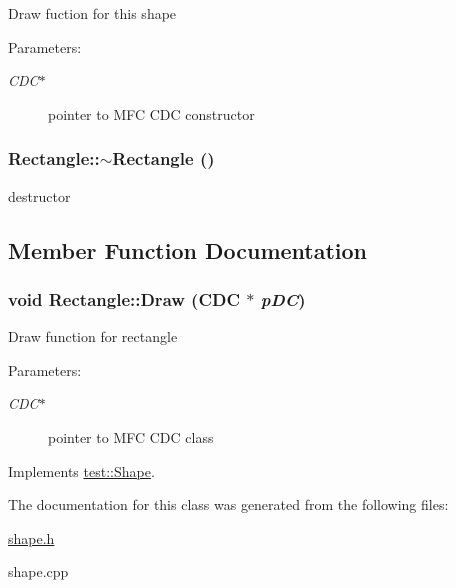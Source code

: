 Draw fuction for this shape \begin{Desc}
\item[Parameters:]
\begin{description}
\item[{\em CDC$\ast$}]pointer to MFC CDC constructor \end{description}
\end{Desc}
\hypertarget{classtest_1_1Rectangle_494c076b13aadf26efdce07d23c61ddd}{
\subsubsection[$\sim$Rectangle]{\setlength{\rightskip}{0pt plus 5cm}Rectangle::$\sim$Rectangle ()}}
\label{classtest_1_1Rectangle_494c076b13aadf26efdce07d23c61ddd}


destructor 

\subsection{Member Function Documentation}
\hypertarget{classtest_1_1Rectangle_22e5e5f9e3c7474d3586e1d7d36bb069}{
\subsubsection[Draw]{\setlength{\rightskip}{0pt plus 5cm}void Rectangle::Draw (CDC $\ast$ {\em pDC})}}
\label{classtest_1_1Rectangle_22e5e5f9e3c7474d3586e1d7d36bb069}


Draw function for rectangle \begin{Desc}
\item[Parameters:]
\begin{description}
\item[{\em CDC$\ast$}]pointer to MFC CDC class \end{description}
\end{Desc}


Implements \hyperlink{classtest_1_1Shape_71718b8d8832ba737879df3d78b22204}{test::Shape}.

The documentation for this class was generated from the following files:\begin{CompactItemize}
\item 
\hyperlink{shape_8h}{shape.h}\item 
shape.cpp\end{CompactItemize}
